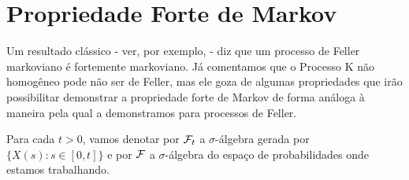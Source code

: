 
\section{Propriedade Forte de Markov}
\label{sec:prop-forte-markov}

Um resultado clássico - ver, por exemplo, \cite{fristedt:97} - diz que
um processo de Feller markoviano é fortemente markoviano. Já
comentamos que o Processo K não homogêneo pode não ser de Feller, mas
ele goza de algumas propriedades que irão possibilitar demonstrar a
propriedade forte de Markov de forma análoga à maneira pela qual a
demonstramos para processos de Feller.

Para cada $t > 0$, vamos denotar por ${\mathcal{F}}_t$ a $\sigma$-álgebra gerada
por $\{X(s): s \in [0, t]\}$ e por ${\mathcal{F}}$ a $\sigma$-álgebra do espaço
de probabilidades onde estamos trabalhando.

